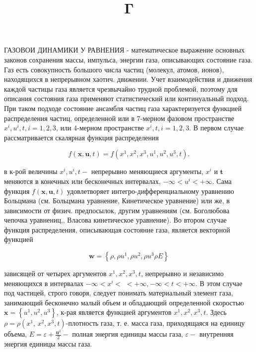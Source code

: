 \documentclass[10pt]{article}
\title{$\mathbf{\Gamma}$ }
\author{}
\date{}
\begin{document}
\maketitle

ГАЗОВОИ ДИНАМИКИ У РАВНЕНИЯ - математическое выражение основных законов сохранения массы, импульса, энергии газа, описывающих состояние газа. Газ есть совокупность большого числа частиц (молекул, атомов, ионов), находящихся в непрерывном хаотич. движении. Учет взаимодействия и движения каждой частицы газа является чрезвычайно трудной проблемой, поэтому для описания состояния газа применяют статистический или континуальный подход. При таком подходе состояние ансамбля частиц газа характеризуется функцией распределения частиц, определенной или в 7-мерном фазовом пространстве $x^{i}, u^{i}, t, i=1,2,3$, или 4-мерном пространстве $x^{i}, t, i=1,2,3$. В первом случае рассматривается скалярная функция распределения



\[

f(\boldsymbol{x}, \boldsymbol{u}, t)=f\left(x^{1}, x^{2}, x^{3}, u^{1}, u^{2}, u^{3}, t\right) .

\]



в к-рой величины $x^{i}, u^{i}, t-$ непрерывно меняющиеся аргументы, $x^{i}$ и $\boldsymbol{t}$ меняются в конечных или бесконечных интервалах, $-\infty<u^{i}<+\infty$. Сама функция $f(\boldsymbol{x}, \boldsymbol{u}, t)$ удовлетворяет интегро-дифференциальному уравнению Больцмана (см. Больцмана уравнение, Кинетическое уравнение) или же, в зависимости от физич. предпосылок, другим уравнениям (см. Боголюбова чепочка уравнениц,, Власова кинетическое уравнение). Во втором случае функция распределения, описывающая состояние газа, является векторной функцией



\[

\boldsymbol{w}=\left\{\rho, \rho u^{1}, \rho u^{2}, \rho u^{3} \rho E\right\}

\]



зависящей от четырех аргументов $x^{1}, x^{2}, x^{3}, t$, непрерывно и независимо меняющихся в интервалах $-\infty<x^{i}<$ $<+\infty,-\infty<t<+\infty$. В этом случае под частицей, строго говоря, следует понимать материальный элемент газа, занимающий бесконечно малый объем и обладающий определенной скоростью $\boldsymbol{x}=\left\{u^{1}, u^{2}, u^{3}\right\}$, к-рая является функцией аргументов $x^{1}, x^{2}, x^{3}, t$. Здесь $\rho=\rho\left(x^{1}\right.$, $\left.x^{2}, x^{3}, t\right)$-плотность газа, т. е. масса газа, приходящаяся на единицу объема, $E=\varepsilon+\frac{\boldsymbol{u}^{2}}{2}-$ полная энергия единицы массы газа, $\varepsilon-$ внутренняя энергия единицы массы газа.
\end{document}
